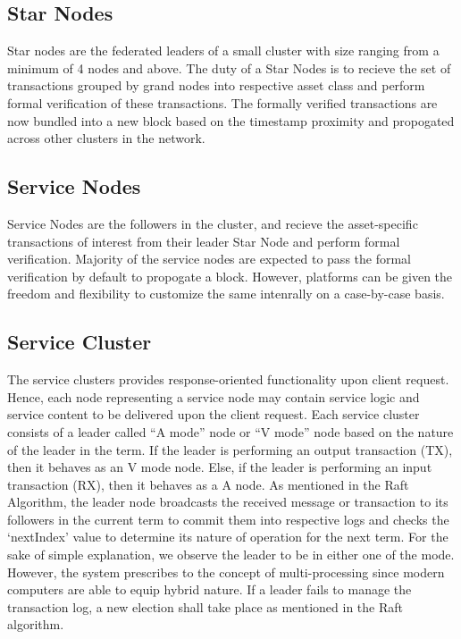 \documentclass[]{article}
\begin{document}
\subsection{Star Nodes}
Star nodes are the federated leaders of a small cluster with size ranging from a minimum of 4 nodes and above.
The duty of a Star Nodes is to recieve the set of transactions grouped by grand nodes into respective asset class and perform formal verification of these transactions.
The formally verified transactions are now bundled into a new block based on the timestamp proximity and propogated across other clusters in the network. 

\subsection{Service Nodes}
Service Nodes are the followers in the cluster, and recieve the asset-specific transactions of interest from their leader Star Node and perform formal verification. Majority of the service nodes are expected to pass the formal verification by default to propogate a block. However, platforms can be given the freedom and flexibility to customize the same intenrally on a case-by-case basis.

\subsection{Service Cluster}
The service clusters provides response-oriented functionality upon client request. Hence, each node representing a service node may contain service logic and service content to be delivered upon the client request. Each service cluster consists of a leader called “A mode” node or “V mode” node based on the nature of the leader in the term. If the leader is performing an output transaction (TX), then it behaves as an V mode node. Else, if the leader is performing an input transaction (RX), then it behaves as a A node. As mentioned in the Raft Algorithm\cite{ARTICLE:2}, the leader node broadcasts the received message or transaction to its followers in the current term to commit them into respective logs and checks the ‘nextIndex’ value to determine its nature of operation for the next term. For the sake of simple explanation, we observe the leader to be in either one of the mode. However, the system prescribes to the concept of multi-processing since modern computers are able to equip hybrid nature. If a leader fails to manage the transaction log, a new election shall take place as mentioned in the Raft algorithm\cite{ARTICLE:2}.
\end{document}
